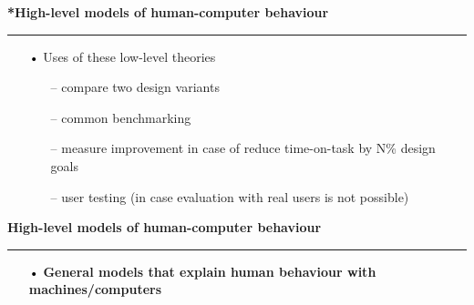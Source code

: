 \documentclass[pdf]{beamer}
\begin{document}
\begin{frame}
\vspace{8mm}
\textcolor{myBlue}{\textbf{\Large{*High-level models of human-computer behaviour}}}

\textcolor{red}{\rule{10cm}{1mm}}

\begin{itemize}
\item[\textcolor{black}{•}] Uses of these low-level theories
	\begin{itemize}
		\item[--] compare two design variants
		\item[--] common benchmarking
		\item[--] measure improvement in case of reduce time-on-task by N\% design goals		
		\item[--] user testing (in case evaluation with real users is not possible)
	\end{itemize}
\end{itemize}
\end{frame}



\begin{frame}
\vspace{8mm}
\textcolor{myBlue}{\textbf{\Large{High-level models of human-computer behaviour}}}

\textcolor{red}{\rule{10cm}{1mm}}

\begin{itemize}
\medskip
\item[\textcolor{black}{•}] \textbf{General models that explain human behaviour with machines/computers}
	\begin{itemize}
	\end{itemize}
\end{itemize}
\end{frame}
\end{document}
